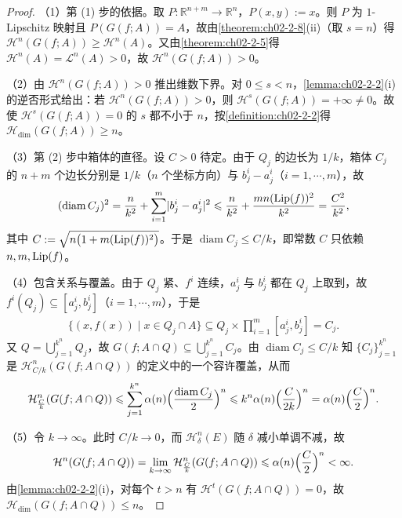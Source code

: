 \documentclass[../../main.tex]{subfiles}%
\begin{document}
\begin{proof}
（1）第 (1) 步的依据。取 $P:\mathbb{R}^{n+m}\to\mathbb{R}^n$，$P(x,y):=x$。则 $P$ 为 $1$-Lipschitz 映射且 $P(G(f;A))=A$，故由\cref{theorem:ch02-2-8}(ii)（取 $s=n$）得 $\mathcal{H}^n(G(f;A))\geqslant\mathcal{H}^n(A)$。又由\cref{theorem:ch02-2-5}得 $\mathcal{H}^n(A)=\mathcal{L}^n(A)>0$，故 $\mathcal{H}^n(G(f;A))>0$。%

（2）由 $\mathcal{H}^n(G(f;A))>0$ 推出维数下界。对 $0\leqslant s<n$，\cref{lemma:ch02-2-2}(i) 的逆否形式给出：若 $\mathcal{H}^n(G(f;A))>0$，则 $\mathcal{H}^s(G(f;A))=+\infty\neq0$。故使 $\mathcal{H}^s(G(f;A))=0$ 的 $s$ 都不小于 $n$，按\cref{definition:ch02-2-2}得 $\mathcal{H}_{\dim}(G(f;A))\geqslant n$。%

（3）第 (2) 步中箱体的直径。设 $C>0$ 待定。由于 $Q_j$ 的边长为 $1/k$，箱体 $C_j$ 的 $n+m$ 个边长分别是 $1/k$（$n$ 个坐标方向）与 $b_j^i-a_j^i$（$i=1,\cdots,m$），故
\begin{align*}
(\operatorname{diam}C_j)^2=\frac{n}{k^2}+\sum_{i=1}^{m}\lvert b_j^i-a_j^i\rvert^2\leqslant\frac{n}{k^2}+\frac{mn(\operatorname{Lip}(f))^2}{k^2}=\frac{C^2}{k^2},
\end{align*}
其中 $C:=\sqrt{n\bigl(1+m(\operatorname{Lip}(f))^2\bigr)}$。于是 $\operatorname{diam}C_j\leqslant C/k$，即常数 $C$ 只依赖 $n,m,\operatorname{Lip}(f)$。

（4）包含关系与覆盖。由于 $Q_j$ 紧、$f^i$ 连续，$a_j^i$ 与 $b_j^i$ 都在 $Q_j$ 上取到，故 $f^i(Q_j)\subseteq[a_j^i,b_j^i]$（$i=1,\cdots,m$），于是
\begin{align*}
\{(x,f(x))\mid x\in Q_j\cap A\}\subseteq Q_j\times\prod_{i=1}^{m}[a_j^i,b_j^i]=C_j .
\end{align*}
又 $Q=\bigcup_{j=1}^{k^n}Q_j$，故 $G(f;A\cap Q)\subseteq\bigcup_{j=1}^{k^n}C_j$。由 $\operatorname{diam}C_j\leqslant C/k$ 知 $\{C_j\}_{j=1}^{k^n}$ 是 $\mathcal{H}^n_{C/k}(G(f;A\cap Q))$ 的定义中的一个容许覆盖，从而
\begin{align*}
\mathcal{H}^n_{\frac{C}{k}}(G(f;A\cap Q))
\leqslant\sum_{j=1}^{k^n}\alpha(n)\Bigl(\frac{\operatorname{diam}C_j}{2}\Bigr)^n
\leqslant k^n\alpha(n)\Bigl(\frac{C}{2k}\Bigr)^n=\alpha(n)\Bigl(\frac{C}{2}\Bigr)^n .
\end{align*}

（5）令 $k\to\infty$。此时 $C/k\to0$，而 $\mathcal{H}^n_\delta(E)$ 随 $\delta$ 减小单调不减，故
\begin{align*}
\mathcal{H}^n(G(f;A\cap Q))=\lim_{k\to\infty}\mathcal{H}^n_{\frac{C}{k}}(G(f;A\cap Q))\leqslant\alpha(n)\Bigl(\frac{C}{2}\Bigr)^n<\infty .
\end{align*}
由\cref{lemma:ch02-2-2}(i)，对每个 $t>n$ 有 $\mathcal{H}^t(G(f;A\cap Q))=0$，故 $\mathcal{H}_{\dim}(G(f;A\cap Q))\leqslant n$。%


\end{proof}
\end{document}

